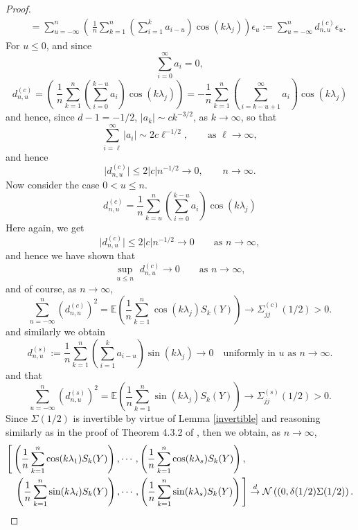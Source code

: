 \documentclass[12pt]{article}
\begin{document}
\begin{proof}
\begin{eqnarray}
&&=\sum_{u=-\infty}^n\left(\
\frac{1}{n}\sum_{k=1}^n\left(\sum_{i=1}^ka_{i-u}\right)\cos(k\lambda_j)\right)\epsilon_u
:=\sum_{u=-\infty}^nd^{(c)}_{n,u}\epsilon_u.\label{combine}
\end{eqnarray}
For $u\le0$, and since
$$
\sum_{i=0}^\infty a_i=0,
$$
$$
d^{(c)}_{n,u}=\left(\
\frac{1}{n}\sum_{k=1}^n\left(\sum_{i=0}^{k-u}a_i\right)\cos(k\lambda_j)\right)=
-\frac{1}{n}\sum_{k=1}^n\left(\sum_{i=k-u+1}^\infty a_i\right)\cos(k\lambda_j)
$$
and hence, since $d-1=-1/2$,  $\vert a_k\vert\sim c k^{-3/2}$, as $k\to\infty$,
so that
$$
\sum_{i=\ell}^\infty \vert a_i\vert \sim2c\ell^{-1/2},\qquad\textrm{as }\ell\to\infty,
$$
and hence 
$$
\vert d^{(c)}_{n,u}\vert\le 2\vert c\vert n^{-1/2}\to0,\qquad n\to\infty.
$$
Now consider the case $0<u\le n$.
$$
d^{(c)}_{n,u}=\frac{1}{n}\sum_{k=u}^n\left(\sum_{i=0}^{k-u}a_i\right)\cos(k\lambda_j)
$$
Here again, we get
$$
\vert d^{(c)}_{n,u}\vert\le 2\vert c\vert n^{-1/2}\to0\qquad\textrm{as }n\to\infty,
$$
and hence we have shown that 
\begin{equation}\label{uniform u}
   \underset{u\le n}{\sup}\,\,d^{(c)}_{n,u}\to0 \qquad\textrm{as }n\to\infty,
\end{equation}
and of course, as $n\to\infty$,
$$
\sum_{u=-\infty}^n\left(d^{(c)}_{n,u}\right)^2=\mathbb{E}\left(\frac{1}{n}\sum_{k=1}^n\cos(k\lambda_{j})S_k(Y)\right)\to\Sigma^{(c)}_{jj}(1/2)>0.
$$
and similarly we obtain 
$$
d^{(s)}_{n,u}:=\frac{1}{n}\sum_{k=1}^n\left(\sum_{i=1}^ka_{i-u}\right)\sin(k\lambda_j)\to0\quad\textrm{uniformly in }u\textrm{ as }n\to\infty.
$$
and that
$$
\sum_{u=-\infty}^n\left(d^{(s)}_{n,u}\right)^2=\mathbb{E}\left(\frac{1}{n}\sum_{k=1}^n\sin(k\lambda_{j})S_k(Y)\right)\to\Sigma^{(s)}_{jj}(1/2)>0.
$$
Since $\Sigma(1/2)$ is invertible by virtue of Lemma \ref{invertible} and reasoning similarly as in the proof of  Theorem 4.3.2 of \cite{MR2977317}, then we obtain, as $n\to\infty$,
\begin{eqnarray*}\lefteqn{
\Bigg[\left(\frac{1}{n}\sum_{k=1}^n\cos(k\lambda_{1})S_k(Y)\right),
\cdots,\left(\frac{1}{n}\sum_{k=1}^n\cos(k\lambda_{s})S_k(Y)\right),}\\
&& \left(\frac{1}{n}\sum_{k=1}^n\sin(k\lambda_{i})S_k(Y)\right),\cdots,\left(\frac{1}{n}\sum_{k=1}^n\sin(k\lambda_{s})S_k(Y)\right)\Bigg]\overset{d}{\rightarrow}\mathcal{N}\left((0,\delta(1/2)\Sigma(1/2)\right). 
\end{eqnarray*}


\end{proof}
\end{document}
